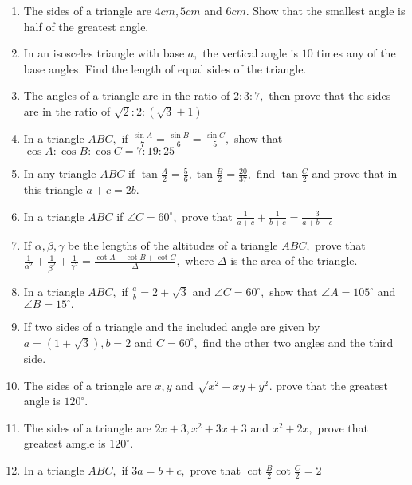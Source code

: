 \begin{enumerate}
\item The sides of a triangle are $4cm, 5cm$ and $6cm.$ Show that the smallest angle is half of the greatest angle.

\item In an isosceles triangle with base $a,$ the vertical angle is $10$ times any of the base angles. Find the length of
    equal sides of the triangle.

\item The angles of a triangle are in the ratio of $2:3:7,$ then prove that the sides are in the ratio of
    $\sqrt{2}:2:(\sqrt{3} + 1)$

\item In a triangle $ABC,$ if $\frac{\sin A}{7} = \frac{\sin B}{6} = \frac{\sin C}{5},$ show that $\cos A:\cos
    B:\cos C = 7:19:25$

\item In any triangle $ABC$ if $\tan\frac{A}{2} = \frac{5}{6}, \tan\frac{B}{2} = \frac{20}{37},$ find
    $\tan\frac{C}{2}$ and prove that in this triangle $a + c = 2b.$

\item In a triangle $ABC$ if $\angle C=60^\circ,$ prove that $\frac{1}{a + c} + \frac{1}{b + c} = \frac{3}{a + b +
    c}$

\item If $\alpha, \beta, \gamma$ be the lengths of the altitudes of a triangle $ABC,$ prove that
    $\frac{1}{\alpha^2} + \frac{1}{\beta^2} + \frac{1}{\gamma^2} = \frac{\cot A + \cot B + \cot C}{\Delta},$ where
    $\Delta$ is the area of the triangle.

\item In a triangle $ABC,$ if $\frac{a}{b} = 2 + \sqrt{3}$ and $\angle C= 60^\circ,$ show that $\angle A =
    105^\circ$ and $\angle B=15^\circ.$

\item If two sides of a triangle and the included angle are given by $a = (1 + \sqrt{3}), b = 2$ and $C=60^\circ,$ find
    the other two angles and the third side.

\item The sides of a triangle are $x, y$ and $\sqrt{x^2 + xy + y^2}.$ prove that the greatest angle is $120^\circ.$

\item The sides of a triangle are $2x + 3, x^2 + 3x + 3$ and $x^2 + 2x,$ prove that greatest amgle is $120^\circ.$

\item In a triangle $ABC,$ if $3a = b + c,$ prove that $\cot\frac{B}{2}\cot\frac{C}{2} = 2$


\end{enumerate}
